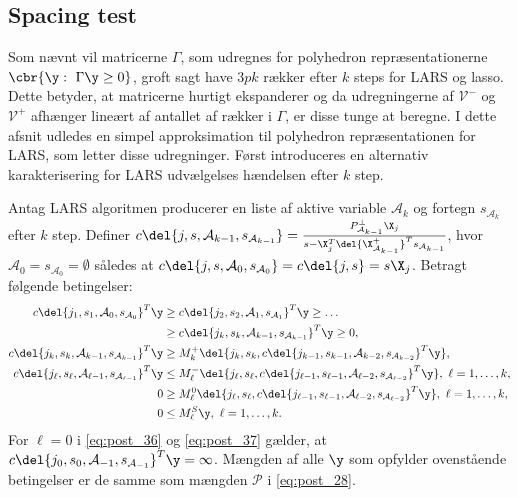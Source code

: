 \subsection{Spacing test}
Som nævnt vil matricerne \(\Gamma\), som udregnes for polyhedron repræsentationerne \(\cbr{\y : \ \Gamma \y \geq 0}\), groft sagt have \(3pk\) rækker efter \(k\) steps for LARS og lasso.
Dette betyder, at matricerne hurtigt ekspanderer og da udregningerne af \(\mathcal{V}^-\) og \(\mathcal{V}^+\) afhænger lineært af antallet af rækker i \(\Gamma\), er disse tunge at beregne.
I dette afsnit udledes en simpel approksimation til polyhedron repræsentationen for LARS, som letter disse udregninger. 
Først introduceres en alternativ karakterisering for LARS udvælgelses hændelsen efter \(k\) step.
%
\begin{lem} \label{lem:post_lem5}
Antag LARS algoritmen producerer en liste af aktive variable \(\mathcal{A}_k\) og fortegn \(s_{\mathcal{A}_k}\) efter \(k\) step.
Definer \(c \del{j, s, \mathcal{A}_{k-1}, s_{\mathcal{A}_{k-1}}} = \frac{P_{\mathcal{A}_{k-1}}^\perp \X_{j}}{s - \X_{j}^T \del{\X_{\mathcal{A}_{k-1}}^+}^T s_{\mathcal{A}_{k-1}}}\), hvor \(\mathcal{A}_0 = s_{\mathcal{A}_0} = \emptyset\) således at \(c \del{j, s, \mathcal{A}_{0}, s_{\mathcal{A}_0}} = c \del{j,s} = s \X_j\).
Betragt følgende betingelser:
\begin{align}
c \del{j_1, s_1, \mathcal{A}_0, s_{\mathcal{A}_0}}^T \y &\geq c \del{j_2, s_2, \mathcal{A}_1, s_{\mathcal{A}_1}}^T \y \geq \dots \nonumber \\
&\geq  c \del{j_k, s_k, \mathcal{A}_{k-1}, s_{\mathcal{A}_{k-1}}}^T \y \geq 0, \label{eq:post_34} \\
c \del{j_k, s_k, \mathcal{A}_{k-1}, s_{\mathcal{A}_{k-1}}}^T \y &\geq M_k^+ \del{j_k, s_k, c \del{j_{k-1}, s_{k-1}, \mathcal{A}_{k-2}, s_{\mathcal{A}_{k-2}}}^T \y}, \label{eq:post_35} \\
c \del{j_\ell, s_\ell, \mathcal{A}_{\ell-1}, s_{\mathcal{A}_{\ell-1}}}^T \y &\leq M_\ell^- \del{j_\ell, s_\ell, c \del{j_{\ell-1}, s_{\ell-1}, \mathcal{A}_{\ell-2}, s_{\mathcal{A}_{\ell-2}}}^T \y}, \ \ell = 1, \ldots, k, \label{eq:post_36} \\
0 &\geq M_\ell^0 \del{j_\ell, s_\ell, c \del{j_{\ell-1}, s_{\ell-1}, \mathcal{A}_{\ell-2}, s_{\mathcal{A}_{\ell-2}}}^T \y}, \ \ell = 1, \ldots, k, \label{eq:post_37} \\
0 &\leq M_\ell^S \y,  \ \ell = 1, \ldots, k. \label{eq:post_38}
\end{align}
For \(\ell = 0\) i \eqref{eq:post_36} og \eqref{eq:post_37} gælder, at \(c \del{j_0, s_0, \mathcal{A}_{-1}, s_{\mathcal{A}_{-1}}}^T \y = \infty\).
Mængden af alle \(\y\) som opfylder ovenstående betingelser er de samme som mængden \(\mathcal{P}\) i \eqref{eq:post_28}.


\end{lem}
